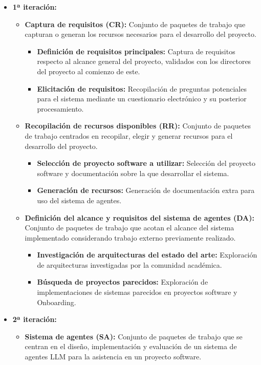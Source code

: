 \begin{itemize}
  \item\textbf{1ª iteración:}
    \begin{itemize}
      \item\textbf{Captura de requisitos (CR): }Conjunto de paquetes de trabajo que capturan o generan los recursos necesarios para el desarrollo del proyecto. 
            \begin{itemize}
          \item\textbf{Definición de requisitos principales: } Captura de requisitos respecto al alcance general del proyecto, validados con los directores del proyecto al comienzo de este.
          \item\textbf{Elicitación de requisitos: }Recopilación de preguntas potenciales para el sistema mediante un cuestionario electrónico y su posterior procesamiento.
        \end{itemize}
      \item\textbf{Recopilación de recursos disponibles (RR): }Conjunto de paquetes de trabajo centrados en recopilar, elegir y generar recursos para el desarrollo del proyecto.
        \begin{itemize}
          \item\textbf{Selección de proyecto software a utilizar: }Selección del proyecto software y documentación sobre la que desarrollar el sistema.
          \item\textbf{Generación de recursos: }Generación de documentación extra para uso del sistema de agentes.
        \end{itemize}
      \item\textbf{Definición del alcance y requisitos del sistema de agentes (DA): }Conjunto de paquetes de trabajo que acotan el alcance del sistema implementado considerando trabajo externo previamente realizado.
    \begin{itemize}
          \item\textbf{Investigación de arquitecturas del estado del arte: }Exploración de arquitecturas investigadas por la comunidad académica.
          \item\textbf{Búsqueda de proyectos parecidos: }Exploración de implementaciones de sistemas parecidos en proyectos software y Onboarding.
    \end{itemize}
      \end{itemize}
  \item\textbf{2ª iteración:}
    \begin{itemize}
      \item\textbf{Sistema de agentes (SA): }Conjunto de paquetes de trabajo que se centran en el diseño, implementación y evaluación de un sistema de agentes LLM para la asistencia en un proyecto software.

\end{itemize}
\end{itemize}
